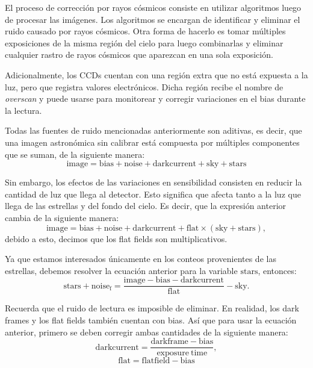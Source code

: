 El proceso de corrección por rayos cósmicos consiste en utilizar algoritmos luego de procesar las imágenes. Los algoritmos se encargan de identificar y eliminar el ruido causado por rayos cósmicos. Otra forma de hacerlo es tomar múltiples exposiciones de la misma región del cielo para luego combinarlas y eliminar cualquier rastro de rayos cósmicos que aparezcan en una sola exposición. 
 
Adicionalmente, los CCDs cuentan con una región extra que no está expuesta a la luz, pero que registra valores electrónicos. Dicha región recibe el nombre de \emph{overscan} y puede usarse para monitorear y corregir variaciones en el bias durante la lectura. 

Todas las fuentes de ruido mencionadas anteriormente son aditivas, es decir, que una imagen astronómica sin calibrar está compuesta por múltiples componentes que se suman, de la siguiente manera:
\[ \mathrm{image = bias + noise + dark current + sky + stars} \]

Sin embargo, los efectos de las variaciones en sensibilidad consisten en reducir la cantidad de luz que llega al detector. Esto significa que afecta tanto a la luz que llega de las estrellas y del fondo del cielo. Es decir, que la expresión anterior cambia de la siguiente manera:
\[ \mathrm{image = bias + noise + dark current + flat\times(sky + stars)}, \]
debido a esto, decimos que los flat fields son multiplicativos. 

Ya que estamos interesados únicamente en los conteos provenientes de las estrellas, debemos resolver la ecuación anterior para la variable $ \mathrm{stars} $, entonces:
\[ \mathrm{stars + noise_f = \frac{image - bias - dark current}{flat}  - sky }. \]

Recuerda que el ruido de lectura es imposible de eliminar. En realidad, los dark frames y los flat fields también cuentan con bias. Así que para usar la ecuación anterior, primero se deben corregir ambas cantidades de la siguiente manera:
\[ \mathrm{dark current = \frac{dark frame - bias}{exposure ~ time}}, \]
\[ \mathrm{flat = flat field - bias} \]
 
 
 
